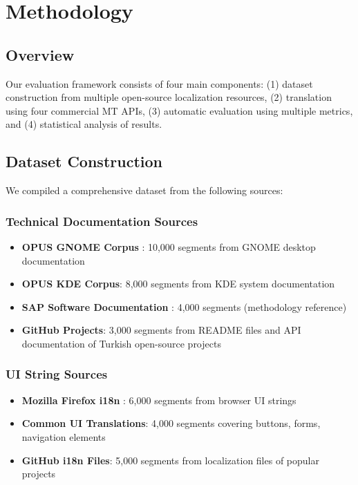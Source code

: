 \section{Methodology}

\subsection{Overview}

Our evaluation framework consists of four main components: (1) dataset construction from multiple open-source localization resources, (2) translation using four commercial MT APIs, (3) automatic evaluation using multiple metrics, and (4) statistical analysis of results.

\subsection{Dataset Construction}

We compiled a comprehensive dataset from the following sources:

\subsubsection{Technical Documentation Sources}

\begin{itemize}
    \item \textbf{OPUS GNOME Corpus} \cite{tiedemann2012parallel}: 10,000 segments from GNOME desktop documentation
    \item \textbf{OPUS KDE Corpus}: 8,000 segments from KDE system documentation
    \item \textbf{SAP Software Documentation} \cite{sap2020dataset}: 4,000 segments (methodology reference)
    \item \textbf{GitHub Projects}: 3,000 segments from README files and API documentation of Turkish open-source projects
\end{itemize}

\subsubsection{UI String Sources}

\begin{itemize}
    \item \textbf{Mozilla Firefox i18n} \cite{mozilla2018localization}: 6,000 segments from browser UI strings
    \item \textbf{Common UI Translations}: 4,000 segments covering buttons, forms, navigation elements
    \item \textbf{GitHub i18n Files}: 5,000 segments from localization files of popular projects
\end{itemize}

